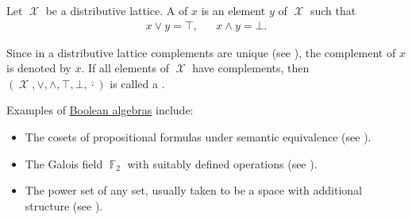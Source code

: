 \begin{definition}\label{def:boolean_algebra}
  Let \( \mscrX \) be a distributive lattice. A  of \( x \) is an element \( y \) of \( \mscrX \) such that
  \begin{align}\label{eq:def:boolean_algebra/complement}
    x \vee y = \top, && x \wedge y = \bot.
  \end{align}

  Since in a distributive lattice complements are unique (see ), the complement of \( x \) is denoted by \( \overline x \). If all elements of \( \mscrX \) have complements, then \( (\mscrX, \vee, \wedge, \top, \bot, \overline \cdot) \) is called a .
\end{definition}

\begin{example}\label{ex:boolean_algebras}
  Examples of \hyperref[def:boolean_algebra]{Boolean algebras} include:

  \begin{itemize}
    \item The cosets of propositional formulas under semantic equivalence (see ).
    \item The Galois field \( \BbbF_2 \) with suitably defined operations (see ).
    \item The power set of any set, usually taken to be a space with additional structure (see ).
  \end{itemize}
\end{example}


